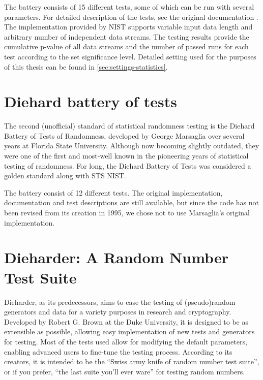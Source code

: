 \documentclass[12pt,oneside]{fithesis2}
\begin{document}
The battery consists of 15 different tests, some of which can be run with several parameters. 
For detailed description of the tests, see the original documentation \cite{sts nist documentation}. 
The implementation provided by NIST supports variable input data length and arbitrary number of independent data streams. 
The testing results provide the cumulative p-value of all data streams and the number of passed runs for each test 
according to the set significance level. 
Detailed setting used for the purposes of this thesis can be found in \autoref{sec:settings-statistics}.

\section{Diehard battery of tests}
\label{sec:diehard}

The second (unofficial) standard of statistical randomness testing is the Diehard Battery of Tests of Randomness, 
developed by George Marsaglia over several years at Florida State University. \cite{diehard website} 
Although now becoming slightly outdated, they were one of the first and most-well known 
in the pioneering years of statistical testing of randomness. 
For long, the Diehard Battery of Tests was considered a golden standard along with STS NIST.

The battery consist of 12 different tests. The original implementation, documentation and test descriptions are still available,
but since the code has not been revised from its creation in 1995, we chose not to use Marsaglia's original implementation.

\section{Dieharder: A Random Number Test Suite}
\label{sec:dieharder}

Dieharder, as its predecessors, aims to ease the testing of (pseudo)random generators and data for a variety purposes in research 
and cryptography. Developed by Robert G. Brown at the Duke University, it is designed to be as extensible as possible, 
allowing easy implementation of new tests and generators for testing. Most of the tests used allow for 
modifying the default parameters, enabling advanced users to fine-tune the testing process.
According to its creators, it is intended to be the ``Swiss army knife of random number test suite'', 
or if you prefer, ``the last suite you'll ever ware'' for testing random numbers. \cite{dieharder web}
\end{document}

